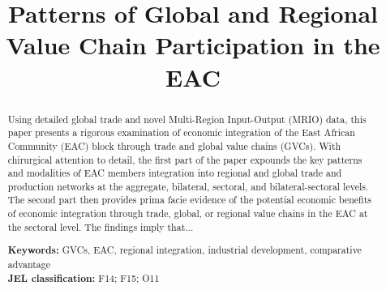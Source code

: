 \documentclass[a4paper]{article}
\title{\textbf{Patterns of Global and Regional Value Chain Participation in the EAC}}
\date{}
\begin{document}
\maketitle


\begin{abstract}
Using detailed global trade and novel Multi-Region Input-Output (MRIO) data, %
this paper presents a rigorous examination of economic integration of the East African Community (EAC) block through trade and global value chains (GVCs). With chirurgical attention to detail, the first part of the paper expounds the key patterns and modalities of EAC members integration into regional and global trade and production networks at the aggregate, bilateral, sectoral, and bilateral-sectoral levels. The second part then provides prima facie evidence of the potential economic benefits of economic integration through trade, global, or regional value chains in the EAC at the sectoral level. The findings imply that...



\noindent \textbf{Keywords:} GVCs, EAC, regional integration, industrial development, comparative advantage\\
\textbf{JEL classification:} F14; F15; O11
\end{abstract}
\end{document}
